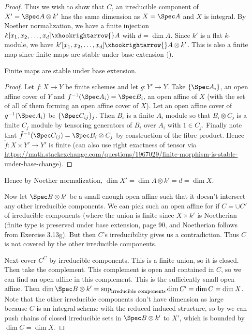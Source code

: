 \begin{proof}
	Thus we wish to show that $C $, an irreducible component of $X' = \Spec A \otimes k' $ has the same dimension as $X = \Spec A $ and $X $ is integral.
	By Noether normalization, we have a finite injection $k[x_{1},x_{2}, \ldots ,x_d] \xhookrightarrow{} A$ with $d = \dim A$.
	Since $k' $ is a flat $k $-module, we have $k'[x_{1}, x_{2}, \ldots ,x_d] \xhookrightarrow{} A \otimes k'$.
	This is also a finite map since finite maps are stable under base extension ().
	\begin{lem}\label{lem:finiteextension}
		Finite maps are stable under base extension.
	\end{lem}
	\begin{proof}
		Let $f: X\to Y $ be finite schemes and let $g:Y'\to Y $.
		Take $\{\Spec A_i\} $, an open affine cover of $Y $ and $f^{-1}(\Spec A_i) = \Spec B_i $, an open affine of $X $ (with the set of all of them forming an open affine cover of $X $).
		Let an open affine cover of $g^{-1}(\Spec A_i) $ be $\{\Spec C_{ij}\}_j   $.
		Then $B_i $ is a finite $A_i $ module so that $B_i \otimes C_j $ is a finite $C_j $ module by tensoring generators of $B_i $ over $A_i$ with $1 \in C_j$.
		Finally note that $\tilde{f}^{-1}(\Spec C_{ij}) = \Spec B_i \otimes C_j $ by construction of the fibre product.
		Hence $\tilde{f}: X \times Y' \to Y' $ is finite (can also use right exactness of tensor via \url{https://math.stackexchange.com/questions/1967029/finite-morphism-is-stable-under-base-change}).
	\end{proof}
	Hence by Noether normalization, $\dim X' = \dim A \otimes k' = d = \dim X$.

	Now let $\Spec B \otimes k' $ be a small enough open affine such that it doesn't intersect any other irreducible components.
	We can pick such an open affine for if $C = \cup C' $ of irreducible components (where the union is finite since $X \times k'$ is Noetherian (finite type is preserved under base extension, page 90, and Noetherian follows from Exercise 3.13g). %
	But then $C $'s irreducibility gives us a contradiction.
	Thus $C $ is not covered by the other irreducible components.

	Next cover $C^C $ by irreducible components.
	This is a finite union, so it is closed.
	Then take the complement.
	This complement is open and contained in $C $, so we can find an open affine in this complement.
	This is the sufficiently small open affine.
	Then $\dim \Spec B \otimes k' =  \sup_{\text{irreducible components}} \dim C'= \dim C=\dim X$.
	Note that the other irreducible components don't have dimension as large because $C $ is an integral scheme with the reduced induced structure, so by  we can push chains of closed irreducible sets in $\Spec B \otimes k' $ to $X' $, which is bounded by $\dim C = \dim X $.


\end{proof}
